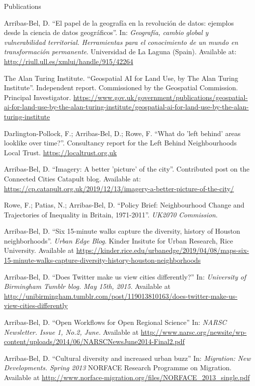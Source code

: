 \documentclass[12pt,2up]{article}
\begin{document}
\begin{cv}{}
\begin{cvlist}{Publications}
\item[\textbf{Other}]
\item[2025] Arribas-Bel, D. ``El papel de la geograf\'ia en la revoluci\'on de datos: ejemplos
        desde la ciencia de datos geogr\'aficos''. In: \textit{Geograf\'ia,
        cambio global y vulnerabilidad territorial. Herramientas para el
conocimiento de un mundo en transformaci\'on permanente}. Universidad de La
Laguna (Spain). Available at:
        \url{http://riull.ull.es/xmlui/handle/915/42264}
\item[2024] The Alan Turing Institute. ``Geospatial AI for Land Use, by The
        Alan Turing Institute''. Independent report. Commissioned by the Geospatial
        Commission. Principal Investigator.
        \url{https://www.gov.uk/government/publications/geospatial-ai-for-land-use-by-the-alan-turing-institute/geospatial-ai-for-land-use-by-the-alan-turing-institute}
\item[2021] Darlington-Pollock, F.; Arribas-Bel, D.; Rowe, F. ``What do 'left
    behind' areas looklike over time?''. Consultancy report for the Left
    Behind Neighbourhoods Local Trust. \url{https://localtrust.org.uk}
\item[2019] Arribas-Bel, D.  ``Imagery: A better 'picture' of the city''.
    Contributed post on the Connected Cities Catapult blog. Available at:
    \url{https://cp.catapult.org.uk/2019/12/13/imagery-a-better-picture-of-the-city/}
\item[] Rowe, F.; Patias, N.; Arribas-Bel, D.  ``Policy Brief:
    Neighbourhood Change and Trajectories of Inequality in Britain,
    1971-2011''. \textit{UK2070 Commission}.
\item[] Arribas-Bel, D.  ``Six 15-minute walks capture the diversity,
    history of Houston neighborhoods''. \textit{Urban Edge Blog}. Kinder Insitute for Urban
    Research, Rice University. Available at
    \url{https://kinder.rice.edu/urbanedge/2019/04/08/maps-six-15-minute-walks-capture-diversity-history-houston-neighborhoods}
\item[2015] Arribas-Bel, D.  ``Does Twitter make us view cities differently?'' In:
    \textit{University of Birmingham Tumblr blog. May 15th, 2015.}
    Available at
    \url{http://unibirmingham.tumblr.com/post/119013810163/does-twitter-make-us-view-cities-differently}
\item[2014] Arribas-Bel, D.  ``Open Workflows for Open Regional Science'' In:
    \textit{NARSC Newsletter. Issue 1, No.2, June.}
    Available at
    \url{http://www.narsc.org/newsite/wp-content/uploads/2014/06/NARSCNewsJune2014-Final2.pdf}
\item[2013] Arribas-Bel, D.  ``Cultural diversity and increased urban buzz'' In:
    \textit{Migration: New Developments. Spring 2013}
    NORFACE Research Programme on Migration. Available at
    \url{http://www.norface-migration.org/files/NORFACE_2013_single.pdf}



\end{cvlist}
\end{cv}
\end{document}
